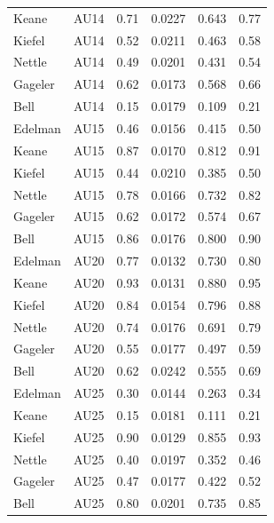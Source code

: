 \documentclass{monashthesis}
\begin{document}
\begin{table}[ht]
\begin{center}
\begin{tabular}{llllll}
Keane & AU14 & 0.71 & 0.0227 & 0.643 & 0.77 \\
Kiefel & AU14 & 0.52 & 0.0211 & 0.463 & 0.58 \\
Nettle & AU14 & 0.49 & 0.0201 & 0.431 & 0.54 \\
Gageler & AU14 & 0.62 & 0.0173 & 0.568 & 0.66 \\
Bell & AU14 & 0.15 & 0.0179 & 0.109 & 0.21 \\
Edelman & AU15 & 0.46 & 0.0156 & 0.415 & 0.50 \\
Keane & AU15 & 0.87 & 0.0170 & 0.812 & 0.91 \\
Kiefel & AU15 & 0.44 & 0.0210 & 0.385 & 0.50 \\
Nettle & AU15 & 0.78 & 0.0166 & 0.732 & 0.82 \\
Gageler & AU15 & 0.62 & 0.0172 & 0.574 & 0.67 \\
Bell & AU15 & 0.86 & 0.0176 & 0.800 & 0.90 \\
Edelman & AU20 & 0.77 & 0.0132 & 0.730 & 0.80 \\
Keane & AU20 & 0.93 & 0.0131 & 0.880 & 0.95 \\
Kiefel & AU20 & 0.84 & 0.0154 & 0.796 & 0.88 \\
Nettle & AU20 & 0.74 & 0.0176 & 0.691 & 0.79 \\
Gageler & AU20 & 0.55 & 0.0177 & 0.497 & 0.59 \\
Bell & AU20 & 0.62 & 0.0242 & 0.555 & 0.69 \\
Edelman & AU25 & 0.30 & 0.0144 & 0.263 & 0.34 \\
Keane & AU25 & 0.15 & 0.0181 & 0.111 & 0.21 \\
Kiefel & AU25 & 0.90 & 0.0129 & 0.855 & 0.93 \\
Nettle & AU25 & 0.40 & 0.0197 & 0.352 & 0.46 \\
Gageler & AU25 & 0.47 & 0.0177 & 0.422 & 0.52 \\
Bell & AU25 & 0.80 & 0.0201 & 0.735 & 0.85 \\
\bottomrule
\end{tabular}
\end{center}
\end{table}
\end{document}
